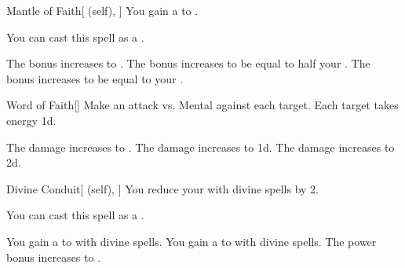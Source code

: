 \lowercase{\hypertarget{spell:Mantle of Faith}{}}\label{spell:Mantle of Faith}
\begin{attuneability}[Rank 1]{\hypertarget{spell:Mantle of Faith}{Mantle of Faith}}[ (self), ]
You gain a   to .

You can cast this spell as a .

\rankline
{} The bonus increases to .
 The bonus increases to be equal to half your .
 The bonus increases to be equal to your .

\end{attuneability}
\vspace{0.25em}



\lowercase{\hypertarget{spell:Word of Faith}{}}\label{spell:Word of Faith}
\begin{freeability}[Rank 1]{\hypertarget{spell:Word of Faith}{Word of Faith}}[]
Make an attack vs. Mental against each target.
\hit Each target takes energy  \minus1d.

\rankline
{} The damage increases to .
 The damage increases to  \plus1d.
 The damage increases to  \plus2d.

\end{freeability}
\vspace{0.25em}



\lowercase{\hypertarget{spell:Divine Conduit}{}}\label{spell:Divine Conduit}
\begin{attuneability}[Rank 2]{\hypertarget{spell:Divine Conduit}{Divine Conduit}}[ (self), ]
You reduce your  with divine spells by 2.

You can cast this spell as a .

\rankline
{} You gain a   to  with divine spells.
 You gain a   to  with divine spells.
 The power bonus increases to .

\end{attuneability}
\vspace{0.25em}



